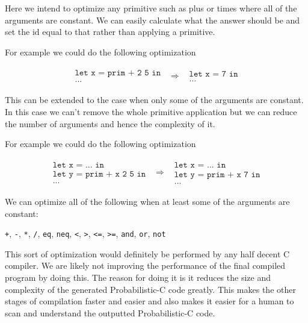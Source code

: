 \documentclass[a4paper]{article}
\newcommand{\optimization}[2]{
	\[
		\begin{array}{rcl}
			#1 & \Rightarrow & #2
		\end{array}
	\]
}
\begin{document}
Here we intend to optimize any primitive such as plus or times where all of the arguments are constant. We can easily calculate what the answer should be and set the id equal to that rather than applying a primitive.

For example we could do the following optimization
\optimization{
	\begin{array}{l}
		\texttt{let x = prim + 2 5 in} \\
		\texttt{...}
	\end{array}
}{
	\begin{array}{l}
		\texttt{let x = 7 in} \\
		\texttt{...}
	\end{array}
}
This can be extended to the case when only some of the arguments are constant. In this case we can't remove the whole primitive application but we can reduce the number of arguments and hence the complexity of it.

For example we could do the following optimization
\optimization{
	\begin{array}{l}
		\texttt{let x = ... in} \\
		\texttt{let y = prim + x 2 5 in} \\
		\texttt{...}
	\end{array}
}{
	\begin{array}{l}
		\texttt{let x = ... in} \\
		\texttt{let y = prim + x 7 in} \\
		\texttt{...}
	\end{array}
}
We can optimize all of the following when at least some of the arguments are constant:
\begin{center}
	\texttt{+}, \texttt{-}, \texttt{*}, \texttt{/}, \texttt{eq}, \texttt{neq}, \texttt{<}, \texttt{>}, \texttt{<=}, \texttt{>=}, \texttt{and}, \texttt{or}, \texttt{not}
\end{center}
This sort of optimization would definitely be performed by any half decent C compiler. We are likely not improving the performance of the final compiled program by doing this. The reason for doing it is it reduces the size and complexity of the generated Probabilistic-C code greatly. This makes the other stages of compilation faster and easier and also makes it easier for a human to scan and understand the outputted Probabilistic-C code.



\end{document}
